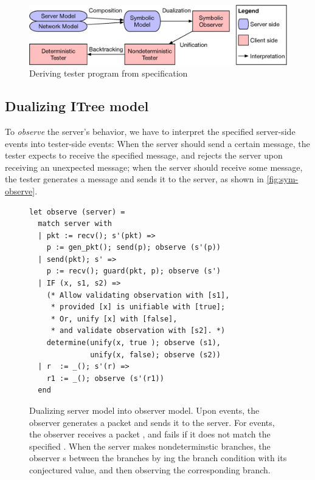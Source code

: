 \begin{figure}
  \includegraphics[width=\linewidth]{figures/framework}
  \caption{Deriving tester program from specification}
  \label{fig:framework}
\end{figure}

\subsection{Dualizing ITree model}
To {\em observe} the server's behavior, we have to interpret the specified
server-side events into tester-side events: When the server should send a
certain message, the tester expects to receive the specified message, and
rejects the server upon receiving an unexpected message; when the server should
receive some message, the tester generates a message and sends it to the server,
as shown in \autoref{fig:sym-observe}.

\begin{figure}
  \begin{lstlisting}[style=customcoq]
let observe (server) =
  match server with
  | pkt := recv(); s'(pkt) =>
    p := gen_pkt(); send(p); observe (s'(p))
  | send(pkt); s' =>
    p := recv(); guard(pkt, p); observe (s')
  | IF (x, s1, s2) =>
    (* Allow validating observation with [s1],
     * provided [x] is unifiable with [true];
     * Or, unify [x] with [false],
     * and validate observation with [s2]. *)
    determine(unify(x, true ); observe (s1),
              unify(x, false); observe (s2))
  | r  := _(); s'(r) =>
    r1 := _(); observe (s'(r1))
  end
  \end{lstlisting}
  \caption{Dualizing server model into observer model.  Upon  events,
    the observer generates a packet and sends it to the server.  For 
    events, the observer receives a packet , and fails if it does not
    match the specified .  When the server makes nondeterminstic
     branches, the observer s between the branches by
    ing the branch condition with its conjectured value, and then
    observing the corresponding branch.
  }
  \label{fig:sym-observe}
\end{figure}

